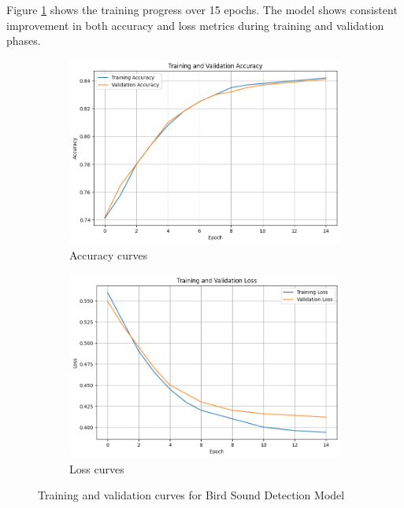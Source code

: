 Figure \ref{fig:training_curves} shows the training progress over 15 epochs. The model shows consistent improvement in both accuracy and loss metrics during training and validation phases.

\begin{figure}[h!]
      \centering
      \begin{subfigure}{\textwidth}
            \includegraphics[width=\textwidth]{images/det_acc.png}
            \caption{Accuracy curves}
      \end{subfigure}
      \begin{subfigure}{\textwidth}
            \includegraphics[width=\textwidth]{images/det_loss.png}
            \caption{Loss curves}
      \end{subfigure}
      \caption{Training and validation curves for Bird Sound Detection Model}
      \label{fig:training_curves}
\end{figure}

